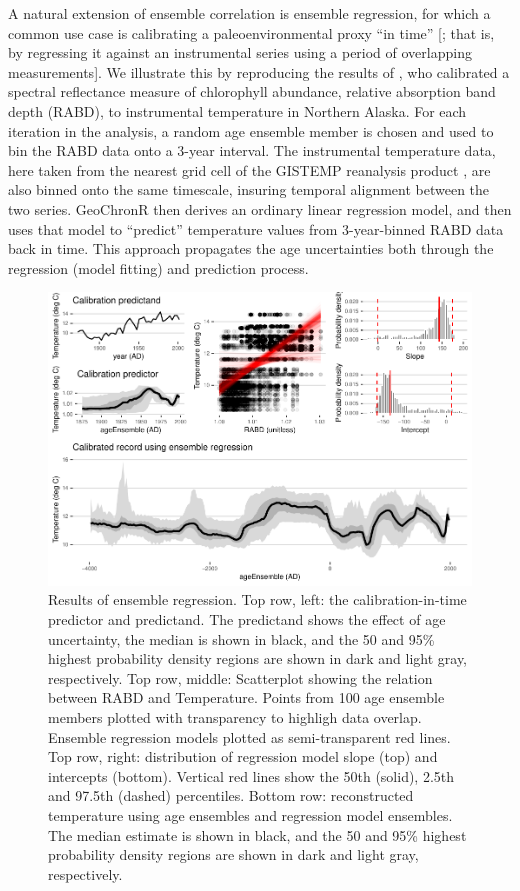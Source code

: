 \documentclass[gchron, manuscript]{copernicus}
\begin{document}
A natural extension of ensemble correlation is ensemble regression, for which a common use case is calibrating a paleoenvironmental proxy ``in time'' {[}\citet{grosjean2009calibration}; that is, by regressing it against an instrumental series using a period of overlapping measurements{]}.
We illustrate this by reproducing the results of \citet{Boldt2015}, who calibrated a spectral reflectance measure of chlorophyll abundance, relative absorption band depth (RABD), to instrumental temperature in Northern Alaska.
For each iteration in the analysis, a random age ensemble member is chosen and used to bin the RABD data onto a 3-year interval.
The instrumental temperature data, here taken from the nearest grid cell of the GISTEMP reanalysis product \citep{hansen2010global}, are also binned onto the same timescale, insuring temporal alignment between the two series.
GeoChronR then derives an ordinary linear regression model, and then uses that model to ``predict'' temperature values from 3-year-binned RABD data back in time.
This approach propagates the age uncertainties both through the regression (model fitting) and prediction process.

\begin{figure}
\includegraphics[width=12cm]{geoChronR-paper_files/figure-latex/regression-1} \caption{Results of ensemble regression. Top row, left: the calibration-in-time predictor and predictand. The predictand shows the effect of age uncertainty, the median is shown in black, and the 50 and 95\% highest probability density regions are shown in dark and light gray, respectively. Top row, middle: Scatterplot showing the relation between RABD and Temperature. Points from 100 age ensemble members plotted with transparency to highligh data overlap. Ensemble regression models plotted as semi-transparent red lines. Top row, right: distribution of regression model slope (top) and intercepts (bottom). Vertical red lines show the 50th (solid), 2.5th and 97.5th (dashed) percentiles. Bottom row: reconstructed temperature using age ensembles and regression model ensembles. The median estimate is shown in black, and the 50 and 95\% highest probability density regions are shown in dark and light gray, respectively.}\label{fig:regression}
\end{figure}
\end{document}
